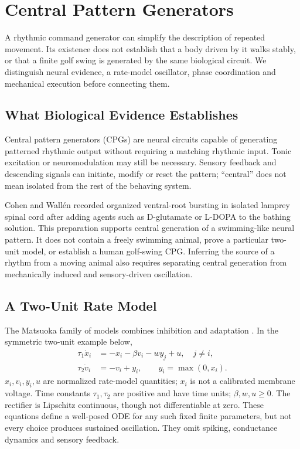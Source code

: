 \chapter{Central Pattern Generators}
\label{ch:cpg}

A rhythmic command generator can simplify the description of repeated movement.
Its existence does not establish that a body driven by it walks stably, or that
a finite golf swing is generated by the same biological circuit. We distinguish
neural evidence, a rate-model oscillator, phase coordination and mechanical
execution before connecting them.

\section{What Biological Evidence Establishes}

Central pattern generators (CPGs) are neural circuits capable of generating
patterned rhythmic output without requiring a matching rhythmic input. Tonic
excitation or neuromodulation may still be necessary. Sensory feedback and
descending signals can initiate, modify or reset the pattern; ``central'' does
not mean isolated from the rest of the behaving system.

Cohen and Wall\'en recorded organized ventral-root bursting in isolated lamprey
spinal cord after adding agents such as D-glutamate or L-DOPA to the bathing
solution\cite{CohenWallen1980}. This preparation supports central generation of
a swimming-like neural pattern. It does not contain a freely swimming animal,
prove a particular two-unit model, or establish a human golf-swing CPG.
Inferring the source of a rhythm from a moving animal also requires separating
central generation from mechanically induced and sensory-driven oscillation.

\section{A Two-Unit Rate Model}

The Matsuoka family of models combines inhibition and adaptation
\cite{Matsuoka1985}. In the symmetric two-unit example below,
\begin{align}
 \tau_1\dot x_i&=-x_i-\beta v_i-w y_j+u,\quad j\ne i,\\
 \tau_2\dot v_i&=-v_i+y_i,\qquad y_i=\max(0,x_i).
 \label{eq:ch8:matsuoka}
\end{align}
$x_i,v_i,y_i,u$ are normalized rate-model quantities; $x_i$ is not a calibrated
membrane voltage. Time constants $\tau_1,\tau_2$ are positive and have time units;
$\beta,w,u\geq0$. The rectifier is Lipschitz continuous, though not differentiable
at zero. These equations define a well-posed ODE for any such fixed finite
parameters, but not every choice produces sustained oscillation. They omit
spiking, conductance dynamics and sensory feedback.

